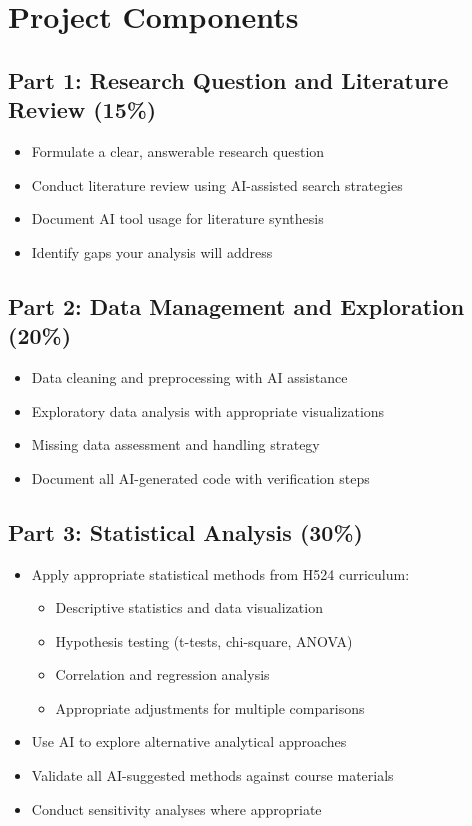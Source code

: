\documentclass[11pt]{article}
\begin{document}
\section{Project Components}

\subsection{Part 1: Research Question and Literature Review (15\%)}
\begin{itemize}
\item Formulate a clear, answerable research question
\item Conduct literature review using AI-assisted search strategies
\item Document AI tool usage for literature synthesis
\item Identify gaps your analysis will address
\end{itemize}

\subsection{Part 2: Data Management and Exploration (20\%)}
\begin{itemize}
\item Data cleaning and preprocessing with AI assistance
\item Exploratory data analysis with appropriate visualizations
\item Missing data assessment and handling strategy
\item Document all AI-generated code with verification steps
\end{itemize}

\subsection{Part 3: Statistical Analysis (30\%)}
\begin{itemize}
\item Apply appropriate statistical methods from H524 curriculum:
    \begin{itemize}
    \item Descriptive statistics and data visualization
    \item Hypothesis testing (t-tests, chi-square, ANOVA)
    \item Correlation and regression analysis
    \item Appropriate adjustments for multiple comparisons
    \end{itemize}
\item Use AI to explore alternative analytical approaches
\item Validate all AI-suggested methods against course materials
\item Conduct sensitivity analyses where appropriate
\end{itemize}
\end{document}
